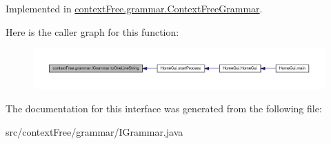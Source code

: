 Implemented in \hyperlink{classcontext_free_1_1grammar_1_1_context_free_grammar_a922203e2db862d2a8ab31e8e7736273b}{context\-Free.\-grammar.\-Context\-Free\-Grammar}.



Here is the caller graph for this function\-:
\nopagebreak
\begin{figure}[H]
\begin{center}
\leavevmode
\includegraphics[width=350pt]{interfacecontext_free_1_1grammar_1_1_i_grammar_a5fdeb5a6a9426b400c2fe805566a377c_icgraph}
\end{center}
\end{figure}




The documentation for this interface was generated from the following file\-:\begin{DoxyCompactItemize}
\item 
src/context\-Free/grammar/I\-Grammar.\-java\end{DoxyCompactItemize}
